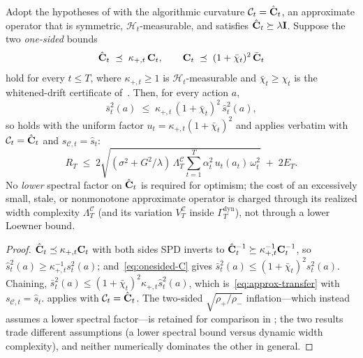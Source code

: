 \documentclass[twoside]{article}
\newcommand{\Calg}{\mathcal{C}}                 %
\newcommand{\Lamalg}{\Lambda^{\Calg}}           %
\newcommand{\Valg}{V^{\Calg}}                   %
\newcommand{\Gamdyn}{\Gamma^{\mathrm{dyn}}}     %
\newcommand{\cHist}{\mathcal{H}}                %
\begin{document}
\begin{theorem}\label{thm:spectral-distortion}
Adopt the hypotheses of  with the algorithmic curvature
$\Calg_t=\hat\bC_t$, an approximate operator that is symmetric,
$\cHist_t$-measurable, and satisfies $\hat{\mathbf{C}}_t\succeq\lambda\mathbf{I}$.  Suppose
the two \emph{one-sided} bounds
\begin{equation}\label{eq:approx-onesided}
  \hat{\mathbf{C}}_t \;\preceq\; \kappa_{+,t}\,\mathbf{C}_t,
  \qquad
  \mathbf{C}_t \;\preceq\; (1+\bar\chi_t)^2\,\bar{\mathbf{C}}_t
\end{equation}
hold for every $t\le T$, where $\kappa_{+,t}\ge1$ is $\cHist_t$-measurable
and $\bar\chi_t\ge\chi_t$ is the whitened-drift certificate
of~.  Then, for every action $a$,
\begin{equation}\label{eq:approx-transfer}
  \bar s_t^2(a)\;\le\;\kappa_{+,t}\,(1+\bar\chi_t)^2\,\hat s_t^2(a),
\end{equation}
so  holds with the uniform factor
$u_t=\kappa_{+,t}(1+\bar\chi_t)^2$ and  applies verbatim
with $\Calg_t=\hat\bC_t$ and $s_{\Calg,t}=\hat s_t$:
\[
  R_T\;\le\;2\sqrt{(\sigma^2+G^2/\lambda)\,\Lamalg_T
    \sum_{t=1}^T\alpha_t^2\,u_t(a_t)\,\omega_t^2}\;+\;2E_T .
\]
No \emph{lower} spectral factor on $\hat{\mathbf{C}}_t$ is required for optimism; the
cost of an excessively small, stale, or nonmonotone approximate operator is
charged through its realized width complexity $\Lamalg_T$ (and its variation
$\Valg_T$ inside $\Gamdyn_T$), not through a lower Loewner bound.
\end{theorem}
\begin{proof}
$\hat{\mathbf{C}}_t\preceq\kappa_{+,t}\mathbf{C}_t$ with both sides SPD inverts to
$\hat{\mathbf{C}}_t^{-1}\succeq\kappa_{+,t}^{-1}\mathbf{C}_t^{-1}$, so
$\hat s_t^2(a)\ge\kappa_{+,t}^{-1}s_t^2(a)$; and~\eqref{eq:onesided-C} gives
$\bar s_t^2(a)\le(1+\bar\chi_t)^2 s_t^2(a)$.  Chaining,
$\bar s_t^2(a)\le(1+\bar\chi_t)^2\kappa_{+,t}\hat s_t^2(a)$, which
is~\eqref{eq:approx-transfer} with $s_{\Calg,t}=\hat s_t$.
 applies with $\Calg_t=\hat\bC_t$.  The two-sided
$\sqrt{\rho_+/\rho_-}$ inflation---which instead assumes a lower spectral
factor---is retained for comparison in ; the two results
trade different assumptions (a lower spectral bound versus dynamic width
complexity), and neither numerically dominates the other in general.
\end{proof}
\end{document}
